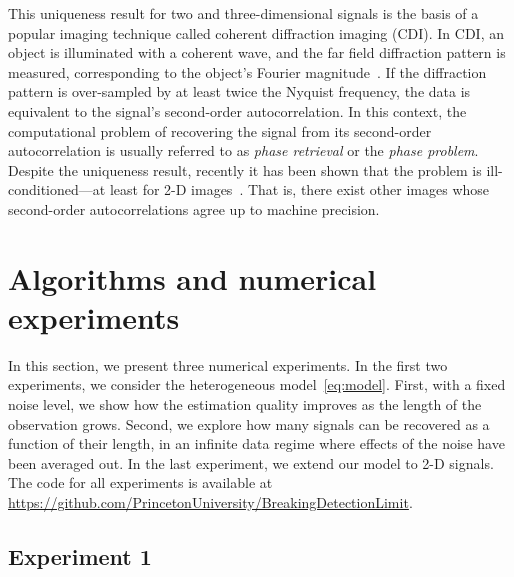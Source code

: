 \documentclass[12pt]{article}
\newcommand{\1}{\mathbf{1}}
\newcommand{\TODO}[1]{{\color{red}{[#1]}}}
\theoremstyle{plain}
\theoremstyle{definition}
\theoremstyle{remark}
\theoremstyle{plain}
\theoremstyle{remark}
\theoremstyle{plain}
\theoremstyle{plain}
\theoremstyle{plain}
\numberwithin{equation}{section}
\begin{document}
This uniqueness result for two and three-dimensional signals is the basis of a popular imaging technique called coherent diffraction imaging (CDI). In CDI, an object is
illuminated with a coherent wave, and the far field diffraction pattern  is measured, corresponding to the object's Fourier magnitude~\cite{miao1999extending,shechtman2015phase}. 
If the diffraction pattern is over-sampled by at least  twice the Nyquist frequency,  the data is equivalent to the signal's second-order autocorrelation. In this context, the computational problem of recovering the signal from its second-order autocorrelation is usually referred to as \emph{phase retrieval} or the \emph{phase problem}.
Despite the uniqueness result, recently it has been shown that the problem is  ill-conditioned---at least for 2-D images~\cite{barnett2018geometry}. That is, there exist other images whose second-order autocorrelations agree up to machine precision. 



\section{Algorithms and numerical experiments} \label{sec:numerics}

In this section, we present three numerical experiments. In the first two experiments, we consider the heterogeneous model~\eqref{eq:model}. First, with a fixed noise level, we show how the estimation quality improves as the length of the observation grows. Second, we explore how many signals can be recovered as a function of their length, in an infinite data regime where effects of the noise have been averaged out. In the last experiment, we extend our model to 2-D signals.
The code for all experiments is available at \url{https://github.com/PrincetonUniversity/BreakingDetectionLimit}. \TODO{Need to upload the code}

\subsection{Experiment 1} 
\label{sec:XP1}
\end{document}
